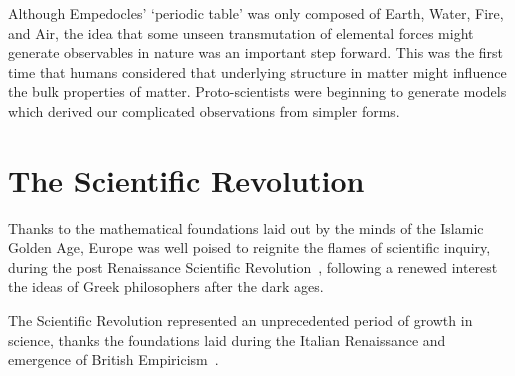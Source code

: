 Although Empedocles' `periodic table' was only composed of Earth, Water, Fire,
and Air, the idea that some unseen transmutation of elemental forces might
generate observables in nature was an important step forward. This was the
first time that humans considered that underlying structure in matter might
influence the bulk properties of matter. Proto-scientists were beginning to
generate models which derived our complicated observations from simpler forms.

\clearpage
\section{The Scientific Revolution}

Thanks to the mathematical foundations laid out by the minds of the Islamic
Golden Age, Europe was well poised to reignite the flames of scientific inquiry,
during the post Renaissance Scientific Revolution~\cite{Alexakos2005}, following
a renewed interest the ideas of Greek philosophers after the dark ages.

The Scientific Revolution represented an unprecedented period of growth in
science, thanks the foundations laid during the Italian Renaissance and
emergence of British Empiricism~\cite{Cowley1968}.

